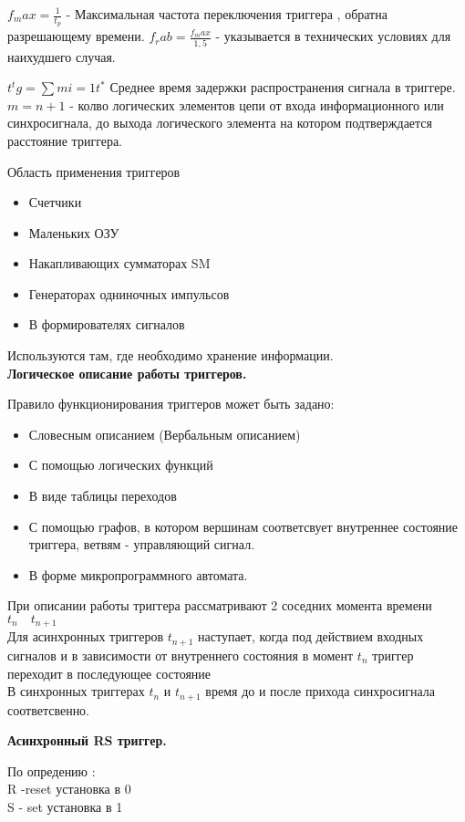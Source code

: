 $f_max = \frac{1}{t_p}$ - Максимальная частота переключения триггера , обратна разрешающему времени.
$f_rab = \frac{f_max}{1,5}$  - указывается в технических условиях для наихудшего случая.

$t^tg = \sum{m}{i = 1} t^* $  Среднее время задержки распространения сигнала в триггере.
$m = n + 1$ - колво логических элементов цепи от входа информационного или синхросигнала, до выхода логического элемента на котором подтверждается расстояние триггера.



Область применения триггеров
\begin{itemize}
  \item Счетчики
  \item Маленьких ОЗУ
  \item Накапливающих сумматорах SM
  \item Генераторах одниночных импульсов
  \item В формирователях сигналов
\end{itemize}
Используются там, где необходимо хранение информации.\\

\textbf  {Логическое описание работы триггеров.}

Правило функционирования триггеров может быть задано:
\begin{itemize}
  \item Словесным описанием (Вербальным описанием)
  \item С помощью логических функций
  \item В виде таблицы переходов
  \item С помощью графов, в котором вершинам соответсвует внутреннее состояние триггера, ветвям - управляющий сигнал.
  \item В форме микропрограммного автомата.
\end{itemize}

При описании работы триггера рассматривают 2 соседних момента времени $t_n \quad t_{n+1}$\\
Для асинхронных триггеров $t_{n+1}$ наступает, когда под действием входных сигналов
и в зависимости от внутреннего состояния в момент $t_n$ триггер переходит в последующее состояние\\

В синхронных триггерах $t_n$ и $t_{n+1}$ время до и после прихода синхросигнала соответсвенно.

\newpage
\textbf {Асинхронный RS триггер.}

По опредению :\\
R -reset установка в 0 \\
S - set  установка в 1 \\

